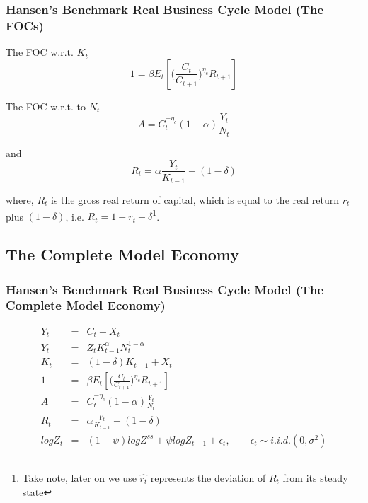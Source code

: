 \documentclass[handout]{beamer}
\begin{document}
\begin{frame}

\frametitle{Hansen's Benchmark Real Business Cycle Model (The FOCs)}
\vskip 0.1in


The FOC w.r.t. $K_{t}$
\begin{equation}\label{Eq3.7}
1 = \beta E_t[\bigl(\frac{C_t}{C_{t+1}}\bigr)^{\eta_{c}}R_{t+1}]
\end{equation}

The FOC w.r.t. to $N_{t}$
\begin{equation}\label{Eq3.8}
A =  C_t^{-\eta_{c}}(1-\alpha)\frac{Y_t}{N_t}
\end{equation}

and
\begin{equation}\label{Eq3.9}
R_t = \alpha\frac{Y_t}{K_{t-1}}+(1-\delta)
\end{equation}

where, $R_t$ is the gross real return of capital, which is equal to
the real return $r_t$ plus $(1-\delta)$, i.e. $R_t = 1+ r_t
-\delta$\footnote{Take note, later on we use $\hat{r_{t}}$
represents the deviation of $R_{t}$ from its steady state }.

\end{frame}

\subsection{The Complete Model Economy}

\begin{frame}

\frametitle{Hansen's Benchmark Real Business Cycle Model (The
Complete Model Economy)}

\begin{eqnarray*}
Y_t &=& C_t+X_t \\
Y_t &=& Z_tK_{t-1}^{\alpha}N_t^{1-\alpha} \\
K_t &=& (1-\delta)K_{t-1} + X_t\\
1 &=& \beta E_t[\bigl(\frac{C_t}{C_{t+1}}\bigr)^{\eta_{c}}R_{t+1}] \\
\label{Eqe}
A &= & C_t^{-\eta_{c}}(1-\alpha)\frac{Y_t}{N_t}\\
R_t &=& \alpha\frac{Y_t}{K_{t-1}}+(1-\delta)\\
logZ_t &=& (1-\psi)logZ^{ss} + \psi logZ_{t-1}+\epsilon_t, \qquad
\epsilon_t\sim i.i.d.(0,\sigma^2)
\end{eqnarray*}


\end{frame}
\end{document}
